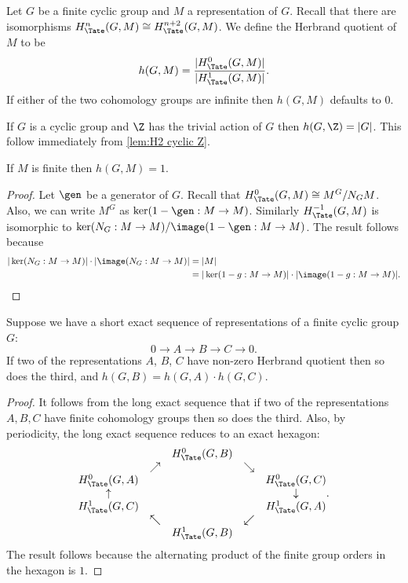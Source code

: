 \begin{definition} \label{def:herbrand quotient}
	Let $G$ be a finite cyclic group and $M$ a representation of $G$.
	Recall that there are isomorphisms $H^n_{\Tate}(G,M) \cong H^{n+2}_{\Tate}(G,M)$.
	We define the Herbrand quotient of $M$ to be
	\[
		h(G,M) = \frac{|H^0_{\Tate}(G,M)|}{|H^1_{\Tate}(G,M)|}.
	\]
	If either of the two cohomology groups are infinite then $h(G,M)$ defaults to $0$.
\end{definition}

\begin{example} \label{eg:herbrand Z}
	If $G$ is a cyclic group and $\Z$ has the trivial action of $G$ then $h(G,\Z) = |G|$.
	This follow immediately from \ref{lem:H2 cyclic Z}.
\end{example}


\begin{lemma} \label{lem:herbrand finite}
	If $M$ is finite then $h(G,M)=1$.
\end{lemma}

\begin{proof}
	Let $\gen$ be a generator of $G$.
	Recall that $H^0_{\Tate}(G,M) \cong M^G / N_GM$.
	Also, we can write $M^G$ as $\ker(1-\gen : M \to M)$.
	Similarly $H^{-1}_{\Tate}(G,M)$ is isomorphic to $\ker (N_G : M \to M) / \image (1-\gen : M \to M)$.
	The result follows because
	\begin{align*}
		|\ker(N_G : M \to M)| \cdot |\image(N_G : M \to M)|
		&=|M|\\
		&=|\ker(1-g : M \to M)| \cdot |\image(1-g : M \to M)|.
	\end{align*}
\end{proof}

\begin{lemma} \label{lem:herbrand ses}
	Suppose we have a short exact sequence of representations of a finite cyclic group $G$:
	\[
		0 \to A \to B \to C \to 0.
	\]
	If two of the representations $A$, $B$, $C$ have non-zero Herbrand quotient then so
	does the third, and $h(G,B) = h(G,A) \cdot h(G,C)$.
\end{lemma}

\begin{proof}
	It follows from the long exact sequence that if two of the representations $A,B,C$
	have finite cohomology groups then so does the third.
	Also, by periodicity, the long exact sequence reduces to an exact hexagon:
	\[
		\begin{matrix}
			&& H^0_{\Tate}(G,B) \\
			&\nearrow && \searrow \\
			H^0_{\Tate}(G,A)  && && H^0_{\Tate}(G,C) \\
			\uparrow & & & & \downarrow \\
			H^1_{\Tate}(G,C) &&&& H^1_{\Tate}(G,A) \\
			& \nwarrow && \swarrow\\
			&& H^1_{\Tate}(G,B)
		\end{matrix}.
	\]
	The result follows because the alternating product of the
	finite group orders in the hexagon is $1$.
\end{proof}



